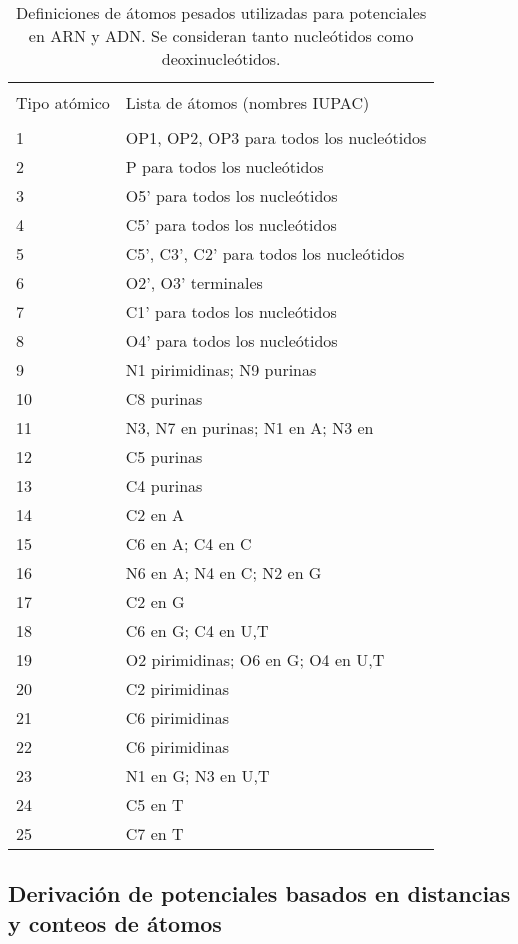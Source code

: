 \begin{table}[!htp]
\begin{tabular}{p{40pt} p{380pt}}
  \hline \\
  Tipo atómico & Lista de átomos (nombres IUPAC) \\
  \hline \\
  1 & OP1, OP2, OP3 para todos los nucleótidos \\
  2 & P para todos los nucleótidos \\
  3 & O5' para todos los nucleótidos \\
  4 & C5' para todos los nucleótidos \\
  5 & C5', C3', C2' para todos los nucleótidos \\
  6 & O2', O3' terminales \\
  7 & C1' para todos los nucleótidos \\
  8 & O4' para todos los nucleótidos \\
  9 & N1 pirimidinas; N9 purinas \\
 10 & C8 purinas \\
 11 & N3, N7 en purinas; N1 en A; N3 en \\
 12 & C5 purinas \\
 13 & C4 purinas \\
 14 & C2 en A \\
 15 & C6 en A; C4 en C \\
 16 & N6 en A; N4 en C; N2 en G \\
 17 & C2 en G \\
 18 & C6 en G; C4 en U,T \\
 19 & O2 pirimidinas; O6 en G; O4 en U,T \\
 20 & C2 pirimidinas \\
 21 & C6 pirimidinas \\
 22 & C6 pirimidinas \\
 23 & N1 en G; N3 en U,T \\
 24 & C5 en T \\
 25 & C7 en T \\
 \hline
\end{tabular}
\caption{Definiciones de átomos pesados utilizadas para potenciales en ARN y ADN. 
Se consideran tanto nucleótidos como deoxinucleótidos.}
\label{table:atomnadef}
\end{table}
\newpage
\clearpage
\subsection{Derivación de potenciales basados en distancias y conteos de átomos}
\par
